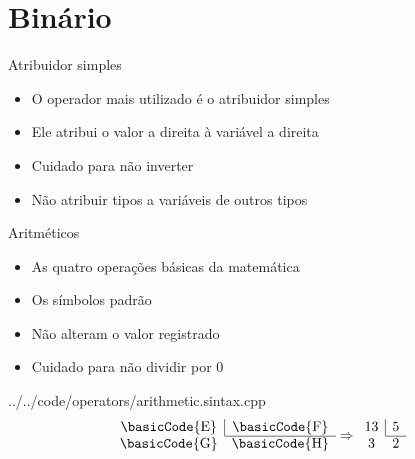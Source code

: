 \documentclass[11pt]{beamer}
\begin{document}
\section{Binário}

	\begin{frame}{Atribuidor simples}
		\only<1>
		{
			\begin{itemize}
				\presentationPause\item O operador mais utilizado é o atribuidor simples
				\presentationPause\item Ele atribui o valor a direita à variável a direita
				\presentationPause\item Cuidado para não inverter
				\presentationPause\item Não atribuir tipos a variáveis de outros tipos
			\end{itemize}
			\presentationPause
		}
		{
			
		}
	\end{frame}

	\begin{frame}{Aritméticos}
		\only<1>
		{
			\begin{itemize}
				\presentationPause\item As quatro operações básicas da matemática
				\presentationPause\item Os símbolos padrão
				\presentationPause\item Não alteram o valor registrado
				\presentationPause\item Cuidado para não dividir por 0
			\end{itemize}
			\presentationPause
			{../../code/operators/arithmetic.sintax.cpp}
			\presentationPause\begin{equation}\nonumber
				\begin{array}{cc}
					\text{\basicCode{E}} & \multicolumn{1}{|c}{\text{\basicCode{F}}} \\ \cline{2-2} 
					\text{\basicCode{G}} & \text{\basicCode{H}}
				\end{array} \Rightarrow \begin{array}{cc}
					13 & \multicolumn{1}{|c}{5} \\ \cline{2-2} 
						3 & 2		
				\end{array}
			\end{equation}
		}
		{
			
		}
	\end{frame}
\end{document}
